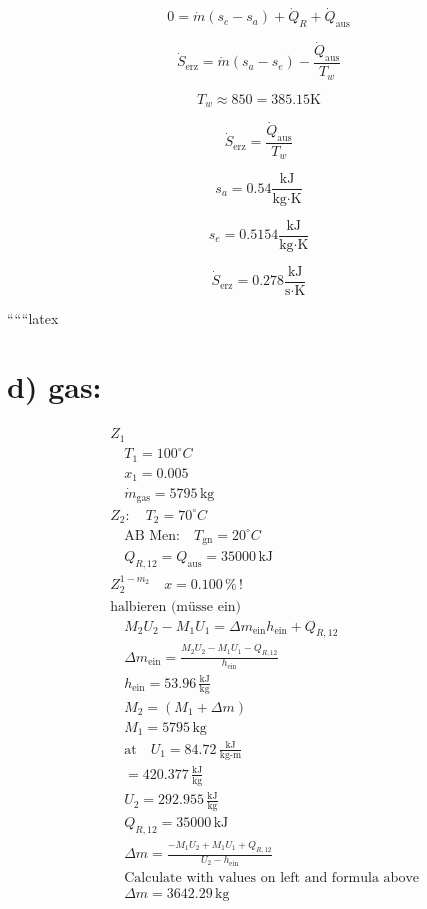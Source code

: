\[
0 = \dot{m} (s_c - s_a) + \dot{Q}_R + \dot{Q}_{\text{aus}}
\]

\[
\dot{S}_{\text{erz}} = \dot{m} (s_a - s_e) - \frac{\dot{Q}_{\text{aus}}}{T_w}
\]

\[
T_w \approx 850 = 385.15 \text{K}
\]

\[
\dot{S}_{\text{erz}} = \frac{\dot{Q}_{\text{aus}}}{T_w}
\]

\[
s_a = 0.54 \frac{\text{kJ}}{\text{kg} \cdot \text{K}}
\]

\[
s_e = 0.5154 \frac{\text{kJ}}{\text{kg} \cdot \text{K}}
\]

\[
\dot{S}_{\text{erz}} = 0.278 \frac{\text{kJ}}{\text{s} \cdot \text{K}}
\]

``````latex


\section*{d) gas: }

\begin{align*}
&Z_1 \\
&\quad T_1 = 100^\circ C \\
&\quad x_1 = 0.005 \\
&\quad \dot{m}_{\text{gas}} = 5795 \, \text{kg} \\
&Z_2: \quad T_2 = 70^\circ C \\
&\quad \text{AB Men:} \quad T_{\text{gn}} = 20^\circ C \\
&\quad Q_{R,12} = Q_{\text{aus}} = 35000 \, \text{kJ} \\
&Z_2^{1-m_2} \quad x = 0.100 \, \% \, ! \\
&\text{halbieren (müsse ein)} \\
&\quad M_2 U_2 - M_1 U_1 = \Delta m_{\text{ein}} h_{\text{ein}} + Q_{R,12} \\
&\quad \Delta m_{\text{ein}} = \frac{M_2 U_2 - M_1 U_1 - Q_{R,12}}{h_{\text{ein}}} \\
&\quad h_{\text{ein}} = 53.96 \, \frac{\text{kJ}}{\text{kg}} \\
&\quad M_2 = (M_1 + \Delta m) \\
&\quad M_1 = 5795 \, \text{kg} \\
&\quad \text{at} \quad U_1 = 84.72 \, \frac{\text{kJ}}{\text{kg-m}} \\
&\quad = 420.377 \, \frac{\text{kJ}}{\text{kg}} \\
&\quad U_2 = 292.955 \, \frac{\text{kJ}}{\text{kg}} \\
&\quad Q_{R,12} = 35000 \, \text{kJ} \\
&\quad \Delta m = \frac{-M_1 U_2 + M_1 U_1 + Q_{R,12}}{U_2 - h_{\text{ein}}} \\
&\quad \text{Calculate with values on left and formula above} \\
&\quad \Delta m = 3642.29 \, \text{kg}
\end{align*}


